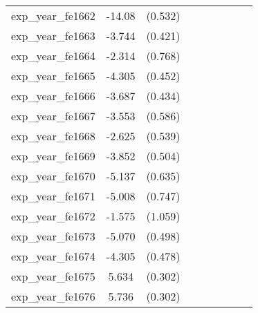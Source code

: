 {\begin{tabular}{l*{4}{cc}}
exp\_year\_fe1662&   -14.08\sym{***}&  (0.532)&                  &         &                  &         &                  &         \\
exp\_year\_fe1663&   -3.744\sym{***}&  (0.421)&                  &         &                  &         &                  &         \\
exp\_year\_fe1664&   -2.314\sym{**} &  (0.768)&                  &         &                  &         &                  &         \\
exp\_year\_fe1665&   -4.305\sym{***}&  (0.452)&                  &         &                  &         &                  &         \\
exp\_year\_fe1666&   -3.687\sym{***}&  (0.434)&                  &         &                  &         &                  &         \\
exp\_year\_fe1667&   -3.553\sym{***}&  (0.586)&                  &         &                  &         &                  &         \\
exp\_year\_fe1668&   -2.625\sym{***}&  (0.539)&                  &         &                  &         &                  &         \\
exp\_year\_fe1669&   -3.852\sym{***}&  (0.504)&                  &         &                  &         &                  &         \\
exp\_year\_fe1670&   -5.137\sym{***}&  (0.635)&                  &         &                  &         &                  &         \\
exp\_year\_fe1671&   -5.008\sym{***}&  (0.747)&                  &         &                  &         &                  &         \\
exp\_year\_fe1672&   -1.575         &  (1.059)&                  &         &                  &         &                  &         \\
exp\_year\_fe1673&   -5.070\sym{***}&  (0.498)&                  &         &                  &         &                  &         \\
exp\_year\_fe1674&   -4.305\sym{***}&  (0.478)&                  &         &                  &         &                  &         \\
exp\_year\_fe1675&    5.634\sym{***}&  (0.302)&                  &         &                  &         &                  &         \\
exp\_year\_fe1676&    5.736\sym{***}&  (0.302)&                  &         &                  &         &                  &         \\

\end{tabular}}
